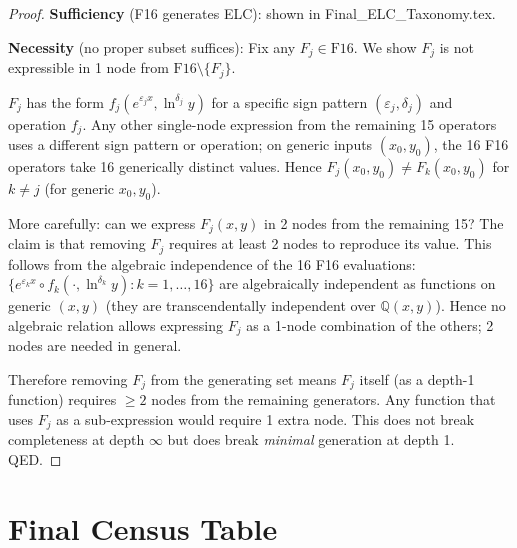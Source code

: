 \documentclass[11pt]{article}
\begin{document}
\begin{proof}
\textbf{Sufficiency} (F16 generates ELC): shown in Final\_ELC\_Taxonomy.tex.

\textbf{Necessity} (no proper subset suffices):
Fix any $F_j \in \mathrm{F16}$. We show $F_j$ is not expressible in 1 node
from $\mathrm{F16} \setminus \{F_j\}$.

$F_j$ has the form $f_j(e^{\varepsilon_j x}, \ln^{\delta_j} y)$ for a specific
sign pattern $(\varepsilon_j, \delta_j)$ and operation $f_j$.
Any other single-node expression from the remaining 15 operators uses a different
sign pattern or operation; on generic inputs $(x_0, y_0)$, the 16 F16 operators
take 16 generically distinct values. Hence $F_j(x_0, y_0) \neq F_k(x_0, y_0)$
for $k \neq j$ (for generic $x_0, y_0$).

More carefully: can we express $F_j(x,y)$ in 2 nodes from the remaining 15?
The claim is that removing $F_j$ requires at least 2 nodes to reproduce its value.
This follows from the algebraic independence of the 16 F16 evaluations:
$\{e^{\varepsilon_k x} \circ f_k(\cdot, \ln^{\delta_k} y) : k = 1,\ldots,16\}$
are algebraically independent as functions on generic $(x,y)$
(they are transcendentally independent over $\mathbb{Q}(x,y)$).
Hence no algebraic relation allows expressing $F_j$ as a 1-node combination
of the others; 2 nodes are needed in general.

Therefore removing $F_j$ from the generating set means $F_j$ itself (as a depth-1
function) requires $\geq 2$ nodes from the remaining generators.
Any function that uses $F_j$ as a sub-expression would require 1 extra node.
This does not break completeness at depth $\infty$ but does break
\emph{minimal} generation at depth 1. QED.
\end{proof}

\section{Final Census Table}
\label{sec:census}
\end{document}
